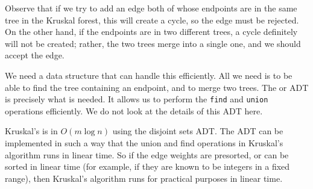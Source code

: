
Observe that if we try to add an edge both of whose endpoints are in
the same tree in the Kruskal forest, this will create a cycle, so the
edge must be rejected. On the other hand, if the endpoints are in two
different trees, a cycle definitely will not be created; rather, the two
trees merge into a single one, and we should accept the edge. 

We need a data structure that can handle this efficiently. All we need is to be
able to find the tree containing an endpoint, and to merge two trees. The
 or  ADT is precisely what
is needed. It allows us to perform the \texttt{find} and \texttt{union}
operations efficiently. We do not look at the details of this ADT here.



Kruskal's is in $O(m \log n)$ using the disjoint sets ADT. 
The ADT can be implemented in such a way that the union and find operations
in Kruskal's algorithm runs in  linear time. So if the edge weights are presorted, or can be
sorted in linear time (for example, if they are known to be integers in
a fixed range), then Kruskal's algorithm runs for practical purposes in
linear time.



